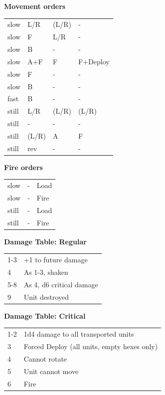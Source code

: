 \documentclass[a4paper,12pt]{article}
\begin{document}
\noindent\textbf{Movement orders}

\begin{tabular}{llll}
slow & L/R & (L/R) & - \\
slow & F & L/R & - \\
slow & B & - & - \\
slow & A+F & F & F+Deploy \\
slow & F & - & - \\
slow & B & - & - \\
fast & B & - & - \\
still & L/R & (L/R) & (L/R) \\
still & - & - & - \\
still & (L/R) & A & F \\
still & rev & - & - \\
\end{tabular}
\vspace{1ex}


\noindent\textbf{Fire orders}

\begin{tabular}{lll}
slow & - & Load \\
slow & - & Fire \\
still & - & Load \\
still & - & Fire \\
\end{tabular}
\vspace{1ex}


\noindent\textbf{Damage Table: Regular}

\begin{tabular}{@{}lp{}@{}}
1-3 & +1 to future damage \\
4 & As 1-3, shaken \\
5-8 & As 4, d6 critical damage \\
9 & Unit destroyed \\
\end{tabular}
\vspace{1ex}

\noindent\textbf{Damage Table: Critical}

\begin{tabular}{@{}lp{}@{}}
1-2 & 1d4 damage to all transported units \\
3 & Forced Deploy (all units, empty hexes only) \\
4 & Cannot rotate \\
5 & Unit cannot move \\
6 & Fire \\
\end{tabular}
\vspace{1ex}
\end{document}
